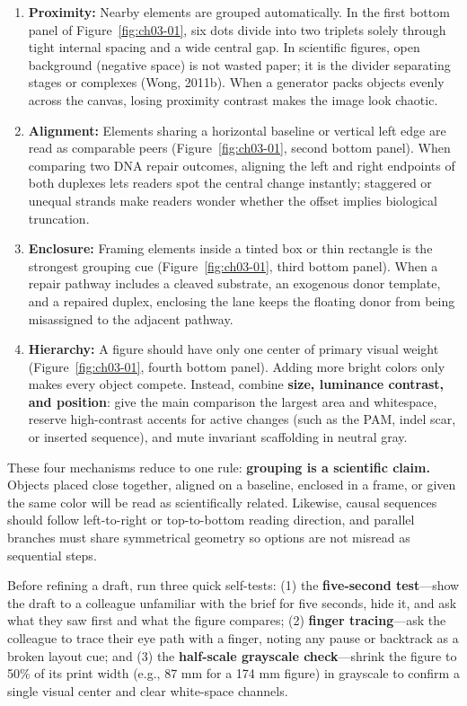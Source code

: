 \begin{enumerate}
\item \textbf{Proximity:} Nearby elements are grouped automatically. In the first bottom panel of Figure~\ref{fig:ch03-01}, six dots divide into two triplets solely through tight internal spacing and a wide central gap. In scientific figures, open background (negative space) is not wasted paper; it is the divider separating stages or complexes (Wong, 2011b). When a generator packs objects evenly across the canvas, losing proximity contrast makes the image look chaotic.
\item \textbf{Alignment:} Elements sharing a horizontal baseline or vertical left edge are read as comparable peers (Figure~\ref{fig:ch03-01}, second bottom panel). When comparing two DNA repair outcomes, aligning the left and right endpoints of both duplexes lets readers spot the central change instantly; staggered or unequal strands make readers wonder whether the offset implies biological truncation.
\item \textbf{Enclosure:} Framing elements inside a tinted box or thin rectangle is the strongest grouping cue (Figure~\ref{fig:ch03-01}, third bottom panel). When a repair pathway includes a cleaved substrate, an exogenous donor template, and a repaired duplex, enclosing the lane keeps the floating donor from being misassigned to the adjacent pathway.
\item \textbf{Hierarchy:} A figure should have only one center of primary visual weight (Figure~\ref{fig:ch03-01}, fourth bottom panel). Adding more bright colors only makes every object compete. Instead, combine \textbf{size, luminance contrast, and position}: give the main comparison the largest area and whitespace, reserve high-contrast accents for active changes (such as the PAM, indel scar, or inserted sequence), and mute invariant scaffolding in neutral gray.
\end{enumerate}

These four mechanisms reduce to one rule: \textbf{grouping is a scientific claim.} Objects placed close together, aligned on a baseline, enclosed in a frame, or given the same color will be read as scientifically related. Likewise, causal sequences should follow left-to-right or top-to-bottom reading direction, and parallel branches must share symmetrical geometry so options are not misread as sequential steps.

Before refining a draft, run three quick self-tests: (1) the \textbf{five-second test}—show the draft to a colleague unfamiliar with the brief for five seconds, hide it, and ask what they saw first and what the figure compares; (2) \textbf{finger tracing}—ask the colleague to trace their eye path with a finger, noting any pause or backtrack as a broken layout cue; and (3) the \textbf{half-scale grayscale check}—shrink the figure to 50\% of its print width (e.g., 87 mm for a 174 mm figure) in grayscale to confirm a single visual center and clear white-space channels.


